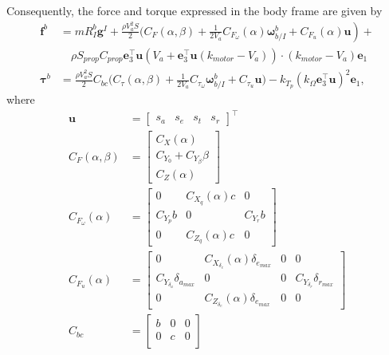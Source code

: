 \documentclass[letterpaper, 10 pt, conference]{ieeeconf}  %
\begin{document}
\begin{appendices}
Consequently, the force and torque expressed in the body frame are given by
\begin{align}
\mathbf{f}^{b} & =mR_{I}^{b}\mathbf{g}^{I}+\frac{\rho V_{a}^{2}S}{2}\bigg(C_{F}\left(\alpha,\beta\right)+\left.\frac{1}{2V_{a}}C_{F_{\omega}}\left(\alpha\right)\boldsymbol{\omega}_{b/I}^{b}+C_{F_{u}}\left(\alpha\right)\mathbf{u}\right)+\nonumber\\
&\quad\rho S_{prop}C_{prop}\mathbf{e}_{3}^{\top}\mathbf{u}\left(V_{a}+\mathbf{e}_{3}^{\top}\mathbf{u}\left(k_{motor}-V_{a}\right)\right)\cdot\nonumber\left(k_{motor}-V_{a}\right)\mathbf{e}_{1}\nonumber\\
\boldsymbol{\tau}^{b} & =\frac{\rho V_{a}^{2}S}{2}C_{bc}\bigg(C_{\tau}\left(\alpha,\beta\right)+\frac{1}{2V_{a}}C_{\tau_{\omega}}\boldsymbol{\omega}_{b/I}^{b}+ C_{\tau_{u}}\mathbf{u}\bigg)-k_{T_{p}}\left(k_{\Omega}\mathbf{e}_{3}^{\top}\mathbf{u}\right)^{2}\mathbf{e}_{1},\nonumber
\end{align}
where
\begin{align}
\mathbf{u} & =\begin{bmatrix}s_{a} & s_{e} & s_{t} & s_{r}\end{bmatrix}^{\top}\\
C_{F}\left(\alpha,\beta\right) & =\begin{bmatrix}C_{X}\left(\alpha\right)\\
C_{Y_{0}}+C_{Y_{\beta}}\beta\\
C_{Z}\left(\alpha\right)
\end{bmatrix}\\
C_{F_{\omega}}\left(\alpha\right) & =\begin{bmatrix}0 & C_{X_{q}}\left(\alpha\right)c & 0\\
C_{Y_{p}}b & 0 & C_{Y_{r}}b\\
0 & C_{Z_{q}}\left(\alpha\right)c & 0
\end{bmatrix}\\
C_{F_{u}}\left(\alpha\right) & =\begin{bmatrix}0 & C_{X_{\delta_{e}}}\left(\alpha\right)\delta_{e_{max}} & 0 & 0\\
C_{Y_{\delta_{a}}}\delta_{a_{max}} & 0 & 0 & C_{Y_{\delta_{r}}}\delta_{r_{max}}\\
0 & C_{Z_{\delta_{e}}}\left(\alpha\right)\delta_{e_{max}} & 0 & 0
\end{bmatrix}\\
C_{bc} & =\begin{bmatrix}b & 0 & 0\\
0 & c & 0\\

\end{bmatrix}
\end{align}
\end{appendices}
\end{document}
